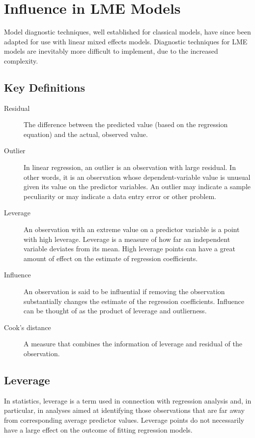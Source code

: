 \documentclass[12pt, a4paper]{article}
\begin{document}
			
\section{Influence in LME Models}
			
Model diagnostic techniques, well established for classical models, have since been adapted for use with linear mixed effects models. Diagnostic techniques for LME models are inevitably more difficult to implement, due to the increased complexity.
			

\subsection{Key Definitions}
\begin{description}
	\item[ Residual] The difference between the predicted value (based on the regression equation) and the actual, observed value.
	
	\item[ Outlier] In linear regression, an outlier is an observation with large residual. In other words, it is an observation whose dependent-variable value is unusual given its value on the predictor variables. An outlier may indicate a sample peculiarity or may indicate a data entry error or other problem.
	
	\item[ Leverage] An observation with an extreme value on a predictor variable is a point with high leverage. Leverage is a measure of how far an independent variable deviates from its mean. High leverage points can have a great amount of effect on the estimate of regression coefficients.
	
	\item[ Influence] An observation is said to be influential if removing the observation substantially changes the estimate of the regression coefficients.  Influence can be thought of as the product of leverage and outlierness.
	
	\item[ Cook's distance ] A measure that combines the information of leverage and residual of the observation.
\end{description}


\subsection{Leverage}
In statistics, leverage is a term used in connection with regression analysis and, in particular, in analyses aimed at identifying those observations that are far away from corresponding average predictor values. Leverage points do not necessarily have a large effect on the outcome of fitting regression models.
\end{document}
